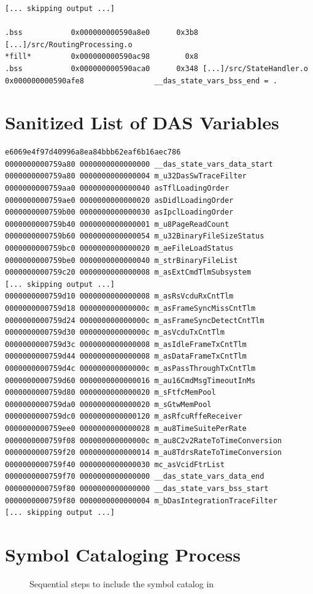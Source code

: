 {{\begin{verbatim}
[... skipping output ...]

.bss           0x000000000590a8e0      0x3b8 [...]/src/RoutingProcessing.o
*fill*         0x000000000590ac98        0x8 
.bss           0x000000000590aca0      0x348 [...]/src/StateHandler.o
0x000000000590afe8                __das_state_vars_bss_end = .
\end{verbatim}
}
\chapter{Sanitized List of DAS Variables}\label{das-symbol-catalog}

{\small
\begin{verbatim}
e6069e4f97d40996a8ea84bbb62eaf6b16aec786
0000000000759a80 0000000000000000 __das_state_vars_data_start
0000000000759a80 0000000000000004 m_u32DasSwTraceFilter
0000000000759aa0 0000000000000040 asTflLoadingOrder
0000000000759ae0 0000000000000020 asDidlLoadingOrder
0000000000759b00 0000000000000030 asIpclLoadingOrder
0000000000759b40 0000000000000001 m_u8PageReadCount
0000000000759b60 0000000000000054 m_u32BinaryFileSizeStatus
0000000000759bc0 0000000000000020 m_aeFileLoadStatus
0000000000759be0 0000000000000040 m_strBinaryFileList
0000000000759c20 0000000000000008 m_asExtCmdTlmSubsystem
[... skipping output ...]
0000000000759d10 0000000000000008 m_asRsVcduRxCntTlm
0000000000759d18 000000000000000c m_asFrameSyncMissCntTlm
0000000000759d24 000000000000000c m_asFrameSyncDetectCntTlm
0000000000759d30 000000000000000c m_asVcduTxCntTlm
0000000000759d3c 0000000000000008 m_asIdleFrameTxCntTlm
0000000000759d44 0000000000000008 m_asDataFrameTxCntTlm
0000000000759d4c 000000000000000c m_asPassThroughTxCntTlm
0000000000759d60 0000000000000016 m_au16CmdMsgTimeoutInMs
0000000000759d80 0000000000000020 m_sFtfcMemPool
0000000000759da0 0000000000000020 m_sGtwMemPool
0000000000759dc0 0000000000000120 m_asRfcuRffeReceiver
0000000000759ee0 0000000000000028 m_au8TimeSuitePerRate
0000000000759f08 000000000000000c m_au8C2v2RateToTimeConversion
0000000000759f20 0000000000000014 m_au8TdrsRateToTimeConversion
0000000000759f40 0000000000000030 mc_asVcidFtrList
0000000000759f70 0000000000000000 __das_state_vars_data_end
0000000000759f80 0000000000000000 __das_state_vars_bss_start
0000000000759f80 0000000000000004 m_bDasIntegrationTraceFilter
[... skipping output ...]

\end{verbatim}
}

\chapter{Symbol Cataloging Process}\label{fig:blackbox-diagram}
\begin{figure}[H]
	\centering
	
	\caption{Sequential steps to include the symbol catalog in }	
\end{figure}

}
